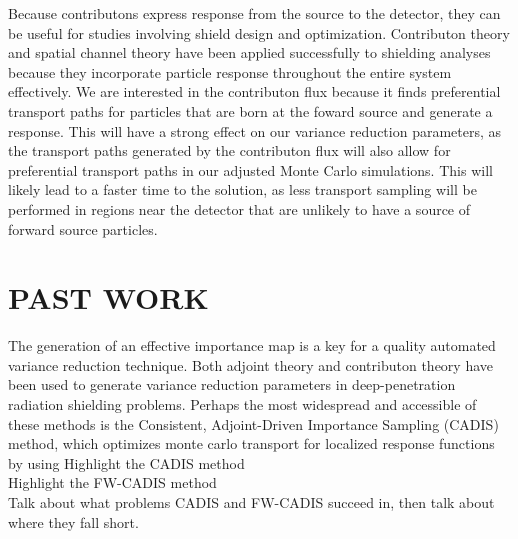 \documentclass[12pt]{article}
\begin{document}
Because contributons express response from the source to the detector, they can be useful for studies involving shield design and optimization. 
Contributon theory and spatial channel theory have been applied successfully to shielding analyses \cite{seydaliev_contributon_2008, williams_SCC_shielding} because they incorporate particle response throughout the entire system effectively. 
We are interested in the contributon flux because it finds preferential transport paths for particles that are born at the foward source and generate a response. This will have a strong effect on our variance reduction parameters, as the transport paths generated by the contributon flux will also allow for preferential transport paths in our adjusted Monte Carlo simulations. This will likely lead to a faster time to the solution, as less transport sampling will be performed in regions near the detector that are unlikely to have a source of forward source particles. 



\section{PAST WORK}
\label{sect::past}

The generation of an effective importance map is a key for a quality automated variance reduction technique. Both adjoint theory and contributon theory have been used to generate variance reduction parameters in deep-penetration radiation shielding problems. Perhaps the most widespread and accessible of these methods is the Consistent, Adjoint-Driven Importance Sampling (CADIS) method, which optimizes monte carlo transport for localized response functions by using 
Highlight the CADIS method \\
Highlight the FW-CADIS method \\
Talk about what problems CADIS and FW-CADIS succeed in, then talk about where they fall short. \\
\end{document}

